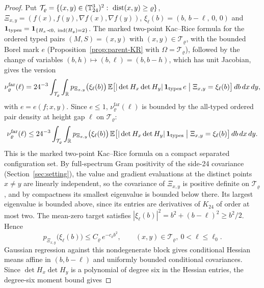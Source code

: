 \begin{proof}
Put $\mathcal T_\varrho=\{(x,y)\in(\mathbb T^3_{24})^2:\ \operatorname{dist}(x,y)\ge\varrho\}$, $\Xi_{x,y}=(f(x),f(y),\nabla f(x),\nabla f(y))$, $\xi_\ell(b)=(b,\,b-\ell,\,0,\,0)$ and $\ind_{\mathrm{types}}=\ind_{\{H_x\prec0,\ \Ind(H_y)=2\}}$. The marked two-point Kac--Rice formula for the ordered typed pairs $(M,S)=(x,y)$ with $(x,y)\in \mathcal T_\varrho$, with the bounded Borel mark $e$ (Proposition~\ref{prop:parent-KR} with $\Omega=\mathcal T_\varrho$), followed by the change of variables $(b,h)\mapsto(b,\ell)=(b,b-h)$, which has unit Jacobian, gives the version
\begin{equation}\label{eq:limit-far-version}
\nu^{\mathrm{far}}_\varrho(\ell)=24^{-3}\int_{\mathcal T_\varrho}\int_{\mathbb R}p_{\Xi_{x,y}}\bigl(\xi_\ell(b)\bigr)\,\mathbb E\bigl[|\det H_x\det H_y|\,\mathbf 1_{\mathrm{types}}\,e\bigm|\Xi_{x,y}=\xi_\ell(b)\bigr]\,db\,dx\,dy ,
\end{equation}
with $e=e(f;x,y)$. Since $e\le1$, $\nu^{\mathrm{far}}_\varrho(\ell)$ is bounded by the all-typed ordered pair density at height gap $\ell$ on $\mathcal T_\varrho$:
\begin{equation}\label{eq:limit-far-alltyped}
\nu^{\mathrm{far}}_\varrho(\ell)\le24^{-3}\int_{\mathcal T_\varrho}\int_{\mathbb R}p_{\Xi_{x,y}}\bigl(\xi_\ell(b)\bigr)\,\mathbb E\bigl[|\det H_x\det H_y|\,\mathbf 1_{\mathrm{types}}\bigm|\Xi_{x,y}=\xi_\ell(b)\bigr]\,db\,dx\,dy .
\end{equation}
This is the marked two-point Kac--Rice formula on a compact separated configuration set. By full-spectrum Gram positivity of the side-24 covariance (Section~\ref{sec:setting}), the value and gradient evaluations at the distinct points $x\ne y$ are linearly independent, so the covariance of $\Xi_{x,y}$ is positive definite on $\mathcal T_\varrho$, and by compactness its smallest eigenvalue is bounded below there. Its largest eigenvalue is bounded above, since its entries are derivatives of $K_{24}$ of order at most two. The mean-zero target satisfies $|\xi_\ell(b)|^2=b^2+(b-\ell)^2\ge b^2/2$. Hence
\begin{equation}\label{eq:limit-far-density}
p_{\Xi_{x,y}}\bigl(\xi_\ell(b)\bigr)\le C_\varrho\,e^{-c_\varrho b^2},\qquad (x,y)\in \mathcal T_\varrho,\ 0<\ell\le\ell_0 .
\end{equation}
Gaussian regression against this nondegenerate block gives conditional Hessian means affine in $(b,b-\ell)$ and uniformly bounded conditional covariances. Since $\det H_x\det H_y$ is a polynomial of degree six in the Hessian entries, the degree-six moment bound gives

\end{proof}
